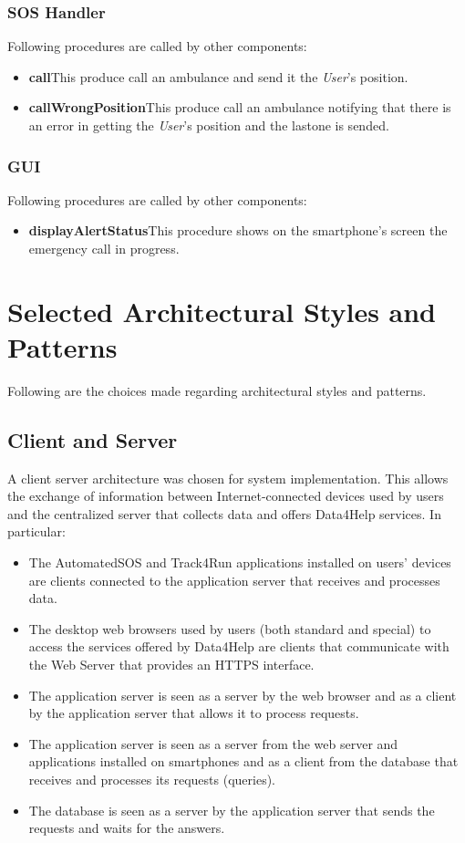 \subsubsection{SOS Handler}
Following procedures are called by other components:
\begin{itemize}
  \item \textbf{call}\quad This produce call an ambulance and send it the \textit{User}'s position.
  \item \textbf{callWrongPosition}\quad This produce call an ambulance notifying that there is an error in getting the \textit{User}'s position and the lastone is sended.
\end{itemize}

\subsubsection{GUI}
Following procedures are called by other components:
\begin{itemize}
  \item \textbf{displayAlertStatus}\quad This procedure shows on the smartphone's screen the emergency call in progress.
\end{itemize}

\section{Selected Architectural Styles and Patterns}\label{architecturalStyle}
Following are the choices made regarding architectural styles and patterns.

\subsection{Client and Server}
A client server architecture was chosen for system implementation.
This allows the exchange of information between Internet-connected devices used by users and the centralized server that collects data and offers Data4Help services.
In particular:
\begin{itemize}
  \item The AutomatedSOS and Track4Run applications installed on users' devices are clients connected to the application server that receives and processes data.
  \item The desktop web browsers used by users (both standard and special) to access the services offered by Data4Help are clients that communicate with the Web Server that provides an HTTPS interface.
  \item The application server is seen as a server by the web browser and as a client by the application server that allows it to process requests.
  \item The application server is seen as a server from the web server and applications installed on smartphones and as a client from the database that receives and processes its requests (queries).
  \item The database is seen as a server by the application server that sends the requests and waits for the answers.
\end{itemize}

